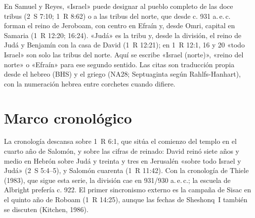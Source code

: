 \begin{nota}
En Samuel y Reyes, «Israel» puede designar al pueblo completo de las doce tribus (2~S 7:10; 1~R 8:62) o a las tribus del norte, que desde c. 931 a.\,e.\,c. forman el reino de Jeroboam, con centro en Efraín y, desde Omri, capital en Samaria (1~R 12:20; 16:24). «Judá» es la tribu y, desde la división, el reino de Judá y Benjamín con la casa de David (1~R 12:21); en 1~R 12:1, 16 y 20 «todo Israel» son solo las tribus del norte. Aquí se escribe «Israel (norte)», «reino del norte» o «Efraín» para ese segundo sentido. Las citas son traducción propia desde el hebreo (BHS) y el griego (NA28; Septuaginta según Rahlfs-Hanhart), con la numeración hebrea entre corchetes cuando difiere.
\end{nota}

\section{Marco cronológico}

La cronología descansa sobre 1~R 6:1, que sitúa el comienzo del templo en el cuarto año de Salomón, y sobre las cifras de reinado: David reinó siete años y medio en Hebrón sobre Judá y treinta y tres en Jerusalén «sobre todo Israel y Judá» (2~S 5:4--5), y Salomón cuarenta (1~R 11:42). Con la cronología de Thiele (1983), que sigue esta serie, la división cae en 931/930 a.\,e.\,c.; la escuela de Albright prefería c. 922. El primer sincronismo externo es la campaña de Sisac en el quinto año de Roboam (1~R 14:25), aunque las fechas de Sheshonq~I también se discuten (Kitchen, 1986).

